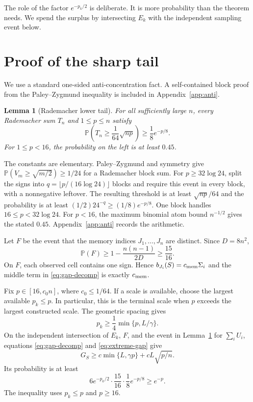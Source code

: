 \documentclass{article}
\newtheorem{lemma}[theorem]{Lemma}
\newcommand{\Pp}{\mathbb P}
\newcommand{\1}{\mathbf 1}
\begin{document}
The role of the factor $e^{-p_k/2}$ is deliberate. It is more probability than the theorem needs. We spend the surplus by intersecting $E_k$ with the independent sampling event below.

\section{Proof of the sharp tail}

We use a standard one-sided anti-concentration fact. A self-contained block proof from the Paley--Zygmund inequality is included in Appendix~\ref{app:anti}.

\begin{lemma}[Rademacher lower tail]\label{lem:rad}
For all sufficiently large $n$, every Rademacher sum $T_n$ and $1\le p\le n$ satisfy
\begin{equation}
 \Pp\!\left(T_n\ge \frac1{64}\sqrt{np}\right)\ge \frac18 e^{-p/8}.
 \label{eq:rad-tail}
\end{equation}
For $1\le p<16$, the probability on the left is at least $0.45$.
\end{lemma}

The constants are elementary. Paley--Zygmund and symmetry give $\Pp(V_m\ge\sqrt{m/2})\ge1/24$ for a Rademacher block sum. For $p\ge32\log24$, split the signs into $q=\lfloor p/(16\log24)\rfloor$ blocks and require this event in every block, with a nonnegative leftover. The resulting threshold is at least $\sqrt{np}/64$ and the probability is at least $(1/2)24^{-q}\ge(1/8)e^{-p/8}$. One block handles $16\le p<32\log24$. For $p<16$, the maximum binomial atom bound $n^{-1/2}$ gives the stated $0.45$. Appendix~\ref{app:anti} records the arithmetic.

Let $F$ be the event that the memory indices $J_1,\ldots,J_n$ are distinct. Since $D=8n^2$,
\begin{equation}
 \Pp(F)\ge1-\frac{n(n-1)}{2D}\ge\frac{15}{16}.
 \label{eq:distinct}
\end{equation}
On $F$, each observed cell contains one sign. Hence $b_{J_i}(S)=c_{\rm mem}\Sigma_i$ and the middle term in \eqref{eq:gap-decomp} is exactly $c_{\rm mem}$.

Fix $p\in[16,c_0n]$, where $c_0\le1/64$. If a scale is available, choose the largest available $p_k\le p$. In particular, this is the terminal scale when $p$ exceeds the largest constructed scale. The geometric spacing gives
\begin{equation}
 p_k\ge\frac14\min\{p,L/\gamma\}.
 \label{eq:chosen-scale}
\end{equation}
On the independent intersection of $E_k$, $F$, and the event in Lemma~\ref{lem:rad} for $\sum_iU_i$, equations \eqref{eq:gap-decomp} and \eqref{eq:extreme-gap} give
\begin{equation}
 G_S\ge c\min\{L,\gamma p\}+cL\sqrt{p/n}.
 \label{eq:joint-gap}
\end{equation}
Its probability is at least \[ 6e^{-p_k/2}\cdot\frac{15}{16}\cdot\frac18e^{-p/8}\ge e^{-p}. \] The inequality uses $p_k\le p$ and $p\ge16$.
\end{document}
